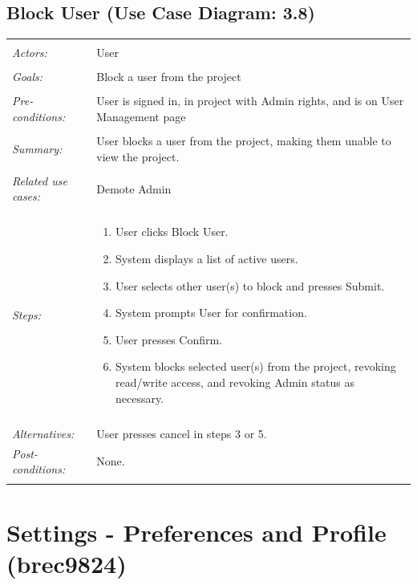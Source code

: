 \documentclass[11pt]{report}
\begin{document}
\subsection{Block User (Use Case Diagram: 3.8)}
\begin{tabular}{ p{2cm} p{12cm} }
    \hline
    \\
    \textit{Actors:} & User \\ 
    \\
    \textit{Goals:} & Block a user from the project \\
    \\
    \textit{Pre-conditions:} & User is signed in, in project with Admin rights, and is on User Management page \\
    \\
    \textit{Summary:} & User blocks a user from the project, making them unable to view the project. \\ 
    \\
    \textit{Related use cases:} & Demote Admin \\ 
    \\
    \textit{Steps:} & \begin{enumerate}
        \item User clicks Block User.
        \item System displays a list of active users.
        \item User selects other user(s) to block and presses Submit.
        \item System prompts User for confirmation.
        \item User presses Confirm.
        \item System blocks selected user(s) from the project, revoking read/write access, and revoking Admin status as necessary.
    \end{enumerate} \\
    \\
    \textit{Alternatives:} & User presses cancel in steps 3 or 5.
    \\
    \textit{Post-conditions:} & None. \\
    \\
    \hline
\end{tabular}


\section{Settings - Preferences and Profile (brec9824)}
\end{document}
